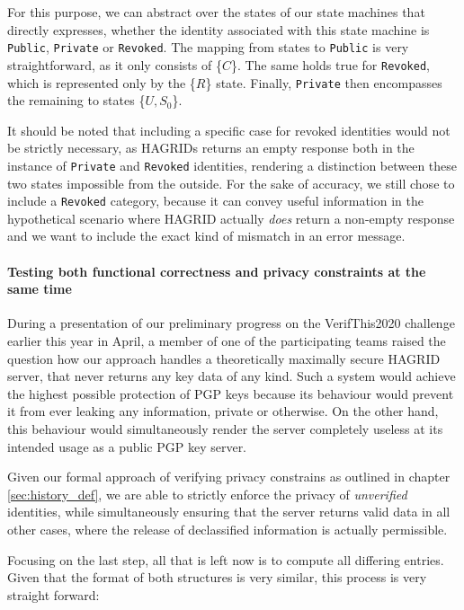 For this purpose, we can abstract over the states of our state machines that directly expresses, whether the identity associated with this state machine is \texttt{Public}, \texttt{Private} or \texttt{Revoked}. The mapping from states to \texttt{Public} is very straightforward, as it only consists of \{\(C\)\}. The same holds true for \texttt{Revoked}, which is represented only by the \{\(R\)\} state. Finally, \texttt{Private} then encompasses the remaining to states \{\(U,S_0\)\}.

It should be noted that including a specific case for revoked identities would not be strictly necessary, as HAGRIDs returns an empty response both in the instance of \texttt{Private} and \texttt{Revoked} identities, rendering a distinction between these two states impossible from the outside. For the sake of accuracy, we still chose to include a \texttt{Revoked} category, because it can convey useful information in the hypothetical scenario where HAGRID actually \emph{does} return a non-empty response and we want to include the exact kind of mismatch in an error message.

\paragraph{Testing both functional correctness and privacy constraints at the same time}
During a presentation of our preliminary progress on the VerifThis2020 challenge earlier this year in April, a member of one of the participating teams raised the question how our approach handles a theoretically maximally secure HAGRID server, that never returns any key data of any kind. Such a system would achieve the highest possible protection of PGP keys because its behaviour would prevent it from ever leaking any information, private or otherwise. On the other hand, this behaviour would simultaneously render the server completely useless at its intended usage as a public PGP key server.

Given our formal approach of verifying privacy constrains as outlined in chapter \ref{sec:history_def}, we are able to strictly enforce the privacy of \emph{unverified} identities, while simultaneously ensuring that the server returns valid data in all other cases, where the release of declassified information is actually permissible. 


Focusing on the last step, all that is left now is to compute all differing entries. Given that the format of both structures is very similar, this process is very straight forward: 

